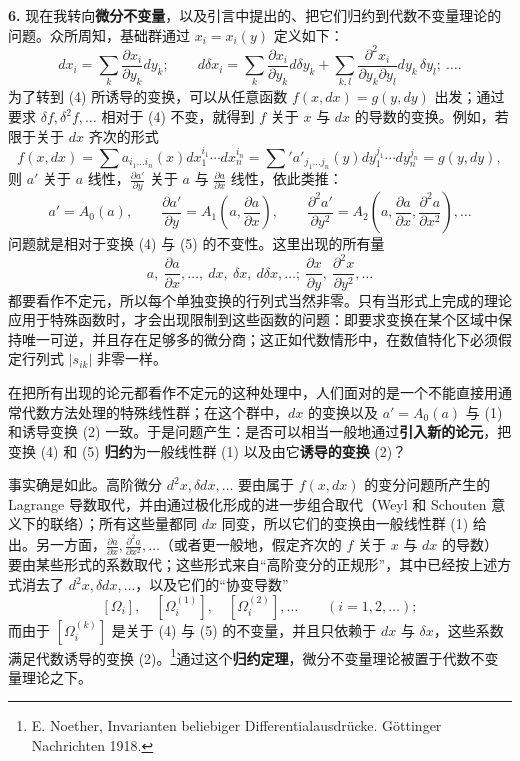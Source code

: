 \documentclass[11pt]{article}
\newcommand{\srcemph}[1]{\textbf{#1}}
\newcommand{\srcnumdisplay}[2]{\begin{equation}\tag{#1}#2\end{equation}}
\begin{document}
\textbf{6.} 现在我转向\srcemph{微分不变量}，以及引言中提出的、把它们归约到代数不变量理论的问题。众所周知，基础群通过 $x_i=x_i(y)$ 定义如下：
\srcnumdisplay{4}{d x_i=\sum_k \frac{\partial x_i}{\partial y_k}d y_k;\qquad
 d\delta x_i=\sum_k \frac{\partial x_i}{\partial y_k}d\delta y_k+
\sum_{k,l}\frac{\partial^2 x_i}{\partial y_k\partial y_l}d y_k\,\delta y_l;\ \ldots .}
为了转到 (4) 所诱导的变换，可以从任意函数 $f(x,d x)=g(y,d y)$ 出发；通过要求 $\delta f,\delta^2f,\ldots$ 相对于 (4) 不变，就得到 $f$ 关于 $x$ 与 $d x$ 的导数的变换。例如，若限于关于 $d x$ 齐次的形式
\[
 f(x,d x)=\sum a_{i_1\ldots i_n}(x)d x_1^{i_1}\cdots d x_n^{i_n}
 =\sum{}' a'_{j_1\ldots j_n}(y)d y_1^{j_1}\cdots d y_n^{j_n}
 =g(y,d y),
\]
则 $a'$ 关于 $a$ 线性，$\frac{\partial a'}{\partial y}$ 关于 $a$ 与 $\frac{\partial a}{\partial x}$ 线性，依此类推：
\srcnumdisplay{5}{a'=A_0(a),\qquad
\frac{\partial a'}{\partial y}=A_1\!\left(a,\frac{\partial a}{\partial x}\right),\qquad
\frac{\partial^2 a'}{\partial y^2}=A_2\!\left(a,\frac{\partial a}{\partial x},\frac{\partial^2 a}{\partial x^2}\right),\ldots}
问题就是相对于变换 (4) 与 (5) 的不变性。这里出现的所有量
\[
a,\ \frac{\partial a}{\partial x},\ldots,\ d x,\ \delta x,\ d\delta x,\ldots;\ 
\frac{\partial x}{\partial y},\ \frac{\partial^2 x}{\partial y^2},\ldots
\]
都要看作不定元，所以每个单独变换的行列式当然非零。只有当形式上完成的理论应用于特殊函数时，才会出现限制到这些函数的问题：即要求变换在某个区域中保持唯一可逆，并且存在足够多的微分商；这正如代数情形中，在数值特化下必须假定行列式 $|s_{ik}|$ 非零一样。

在把所有出现的论元都看作不定元的这种处理中，人们面对的是一个不能直接用通常代数方法处理的特殊线性群；在这个群中，$d x$ 的变换以及 $a'=A_0(a)$ 与 (1) 和诱导变换 (2) 一致。于是问题产生：是否可以相当一般地通过\srcemph{引入新的论元}，把变换 (4) 和 (5) \srcemph{归约}为一般线性群 (1) 以及由它\srcemph{诱导的变换} (2)？

事实确是如此。高阶微分 $d^2x,\delta d x,\ldots$ 要由属于 $f(x,d x)$ 的变分问题所产生的 Lagrange 导数取代，并由通过极化形成的进一步组合取代（Weyl 和 Schouten 意义下的联络）；所有这些量都同 $d x$ 同变，所以它们的变换由一般线性群 (1) 给出。另一方面，$\frac{\partial a}{\partial x},\frac{\partial^2a}{\partial x^2},\ldots$（或者更一般地，假定齐次的 $f$ 关于 $x$ 与 $d x$ 的导数）要由某些形式的系数取代；这些形式来自“高阶变分的正规形”，其中已经按上述方式消去了 $d^2x,\delta d x,\ldots$，以及它们的“协变导数”
\[
 [\Omega_i],\quad [\Omega_i^{(1)}],\quad [\Omega_i^{(2)}],\ldots\qquad (i=1,2,\ldots);
\]
而由于 $[\Omega_i^{(k)}]$ 是关于 (4) 与 (5) 的不变量，并且只依赖于 $d x$ 与 $\delta x$，这些系数满足代数诱导的变换 (2)。\footnote{E. Noether, Invarianten beliebiger Differentialausdrücke. Göttinger Nachrichten 1918.}通过这个\srcemph{归约定理}，微分不变量理论被置于代数不变量理论之下。
\end{document}
